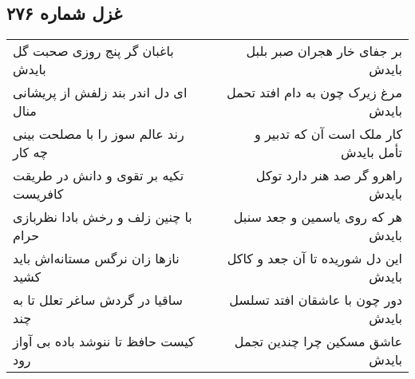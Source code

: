 \begin{center}
\section*{غزل شماره ۲۷۶}
\label{sec:sh276}
\begin{longtable}{l p{0.5cm} r}
باغبان گر پنج روزی صحبت گل بایدش
&&
بر جفای خار هجران صبر بلبل بایدش
\\
ای دل اندر بند زلفش از پریشانی منال
&&
مرغ زیرک چون به دام افتد تحمل بایدش
\\
رند عالم سوز را با مصلحت بینی چه کار
&&
کار ملک است آن که تدبیر و تأمل بایدش
\\
تکیه بر تقوی و دانش در طریقت کافریست
&&
راهرو گر صد هنر دارد توکل بایدش
\\
با چنین زلف و رخش بادا نظربازی حرام
&&
هر که روی یاسمین و جعد سنبل بایدش
\\
نازها زان نرگس مستانه‌اش باید کشید
&&
این دل شوریده تا آن جعد و کاکل بایدش
\\
ساقیا در گردش ساغر تعلل تا به چند
&&
دور چون با عاشقان افتد تسلسل بایدش
\\
کیست حافظ تا ننوشد باده بی آواز رود
&&
عاشق مسکین چرا چندین تجمل بایدش
\\
\end{longtable}
\end{center}
